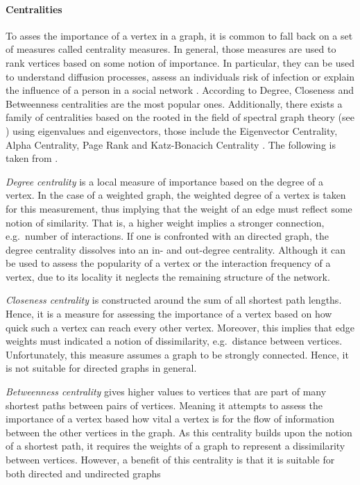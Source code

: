 \documentclass[11pt,a4paper]{book}
\theoremstyle{definition}
\theoremstyle{definition}
\theoremstyle{definition}
\theoremstyle{remark}
\begin{document}
\paragraph{Centralities}
To asses the importance of a vertex in a graph, it is common to fall back on a set of measures called centrality measures.
In general, those measures are used to rank vertices based on some notion of importance. In particular, they can be used to understand diffusion processes, assess an individuals risk of infection or explain the influence of a 
person in a social network \parencite{bloch2019centrality}. According to \parencite{del2011centrality} Degree, Closeness and Betweenness centralities are the most popular ones. Additionally, there exists a family of centralities based on the rooted in the field of spectral graph theory (see \parencite{spielman2012spectral}) using eigenvalues and eigenvectors, those include the Eigenvector Centrality, Alpha Centrality, Page Rank and Katz-Bonacich Centrality  \parencite{bloch2019centrality}. 
The following is taken from \parencite{segarra2015stability,del2011centrality,bloch2019centrality,bonacich2001eigenvector,page1999pagerank}.

\emph{Degree centrality} is a local measure of importance based on the degree of a vertex. In the case of a weighted graph, the weighted degree of a vertex is taken for this measurement, thus implying that the weight of an edge must reflect some notion of similarity. That is, a higher weight implies a stronger connection, e.g.\ number of interactions. If one is confronted with an directed graph, the degree centrality dissolves into an in- and out-degree centrality.
Although it can be used to assess the popularity of a vertex or the interaction frequency of a vertex, due to its locality it neglects the remaining structure of the network. 

\emph{Closeness centrality }is constructed around the sum of all shortest path lengths. Hence, it is a measure for assessing the importance of a vertex based on how quick such a vertex can reach every other vertex. 
Moreover, this implies that edge weights must indicated a notion of dissimilarity, e.g.\ distance between vertices. Unfortunately, this measure assumes a graph to be strongly connected. Hence, it is not suitable for directed graphs in general.  

\emph{Betweenness centrality} gives higher values to vertices that are part of many shortest paths between pairs of vertices. Meaning it attempts to assess the importance of a vertex based how vital a vertex is for the flow of information between the other vertices in the graph. As this centrality builds upon the notion of a shortest path, it requires the weights of a graph to represent a dissimilarity between vertices. However, a benefit of this centrality is that it is suitable for both directed and undirected graphs
\end{document}
